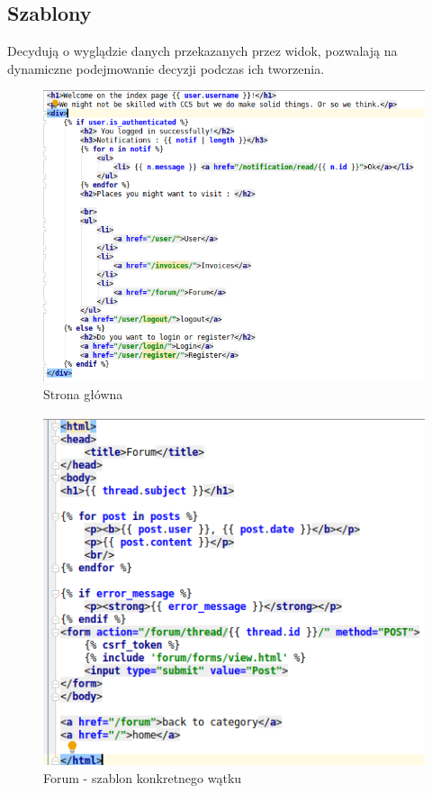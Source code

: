 \documentclass[12pt]{article}
\begin{document}
	\subsection{Szablony}
	Decydują o wyglądzie danych przekazanych przez widok, pozwalają na dynamiczne podejmowanie decyzji podczas ich tworzenia.
	\begin{figure}[H]
		\centering
		\includegraphics[scale=0.7]{img/c_template.png}
		\caption{Strona główna}
	\end{figure}
	\begin{figure}[H]
		\centering
		\includegraphics[scale=0.7]{img/c_forum_template.png}
		\caption{Forum - szablon konkretnego wątku}
	\end{figure}
	\newpage
\end{document}
